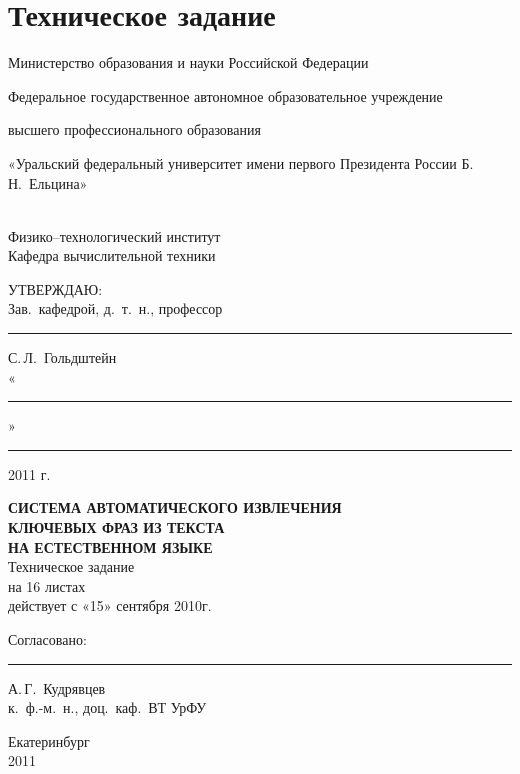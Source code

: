 \chapter{Техническое задание}
\label{chap:RequirementsSpecification}

\newpage
\thispagestyle{empty}
\begin{centering}

\addtolength{\parskip}{-0.25em}
{
\small
Министерство образования и науки Российской Федерации

Федеральное государственное автономное
образовательное учреждение

высшего профессионального образования

«Уральский федеральный университет имени первого
Президента России Б.\,Н.~Ельцина»
} \\
\vspace{0.3em}
Физико--технологический институт \\
\vspace{0.3em}
Кафедра вычислительной техники
\addtolength{\parskip}{0.25em}

\vspace{3em}

\begin{minipage}{.9\textwidth}
\begin{flushright}
  {\large{УТВЕРЖДАЮ:}\vspace{1ex}} \\
  Зав.\ кафедрой, д.\ т.\ н., профессор
  \vspace{0.5ex} \\
  \rule{30mm}{1pt}\hspace{3mm}С.\,Л.~Гольдштейн
  \vspace{0.5ex} \\
  «\rule{10mm}{1pt}» \rule{40mm}{1pt} 2011 г.
\end{flushright}
\end{minipage}

\vspace{4em}

{
  \large
  \textbf{СИСТЕМА АВТОМАТИЧЕСКОГО ИЗВЛЕЧЕНИЯ} \\
  \textbf{КЛЮЧЕВЫХ ФРАЗ ИЗ ТЕКСТА} \\
  \textbf{НА ЕСТЕСТВЕННОМ ЯЗЫКЕ} \\
  \vspace{1em}
  Техническое задание \\
}
на 16 листах \\
действует с «15» сентября 2010г.

\vspace{4em}

\begin{flushleft}
Согласовано: \\
\rule{3cm}{1pt} А.\,Г.~Кудрявцев \\
к.\ ф.-м.\ н., доц.\ каф.~ВТ УрФУ  \\
\end{flushleft}

\vfill

Екатеринбург \\
2011

\end{centering}

